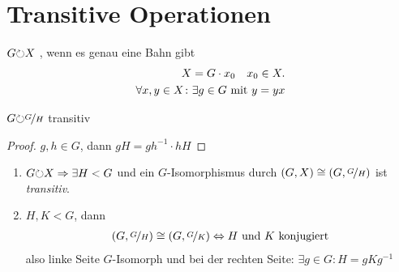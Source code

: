 \section{Transitive Operationen}
\begin{definition}
	$G \Circlearrowleft X$ , wenn es genau eine Bahn gibt
	\begin{align*}
		X = G \cdot x_0 \quad x_0 \in X.\\
		\forall x,y \in X\colon \exists g \in G \mit y = yx
	\end{align*}
\end{definition}
\begin{lemma}
	$G \Circlearrowleft \lnkset{G}{H}$ transitiv
\end{lemma}
\begin{proof}
	$g,h \in G$, dann $gH = gh^{-1}\cdot h H$
\end{proof}
\begin{theorem}
	\begin{enumerate}
		\item $G \Circlearrowleft X \implies \exists H < G$ und ein $G$-Isomorphismus durch $(G,X) \cong (G, \lnkset{G}{H})$ ist \emph{transitiv}.
		\item $H,K < G$, dann
		\begin{align*}
			(G, \lnkset{G}{H}) \cong (G, \lnkset{G}{K}) \Leftrightarrow H \und K \text{ konjugiert} 
		\end{align*}
		also linke Seite $G$-Isomorph und bei der rechten Seite: $\exists g \in G\colon H = gKg^{-1}$
	\end{enumerate}
\end{theorem}